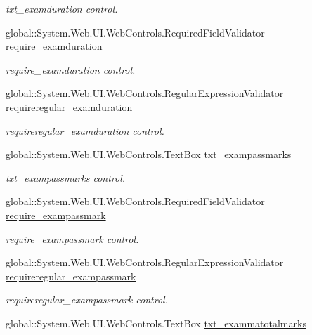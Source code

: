 \begin{DoxyCompactItemize}
\begin{DoxyCompactList}\small\item\em txt\+\_\+examduration control. \end{DoxyCompactList}\item 
global\+::\+System.\+Web.\+U\+I.\+Web\+Controls.\+Required\+Field\+Validator \mbox{\hyperlink{class_admin__exam_ae0f02ff019e950f34484b1da334ed16f}{require\+\_\+examduration}}
\begin{DoxyCompactList}\small\item\em require\+\_\+examduration control. \end{DoxyCompactList}\item 
global\+::\+System.\+Web.\+U\+I.\+Web\+Controls.\+Regular\+Expression\+Validator \mbox{\hyperlink{class_admin__exam_a6f0c2fda924ac5d196aed5c8ca205885}{requireregular\+\_\+examduration}}
\begin{DoxyCompactList}\small\item\em requireregular\+\_\+examduration control. \end{DoxyCompactList}\item 
global\+::\+System.\+Web.\+U\+I.\+Web\+Controls.\+Text\+Box \mbox{\hyperlink{class_admin__exam_aac846d2da109a91c738e315bc4a47ac9}{txt\+\_\+exampassmarks}}
\begin{DoxyCompactList}\small\item\em txt\+\_\+exampassmarks control. \end{DoxyCompactList}\item 
global\+::\+System.\+Web.\+U\+I.\+Web\+Controls.\+Required\+Field\+Validator \mbox{\hyperlink{class_admin__exam_ac1e52aa784d879c0a293f0693011e8be}{require\+\_\+exampassmark}}
\begin{DoxyCompactList}\small\item\em require\+\_\+exampassmark control. \end{DoxyCompactList}\item 
global\+::\+System.\+Web.\+U\+I.\+Web\+Controls.\+Regular\+Expression\+Validator \mbox{\hyperlink{class_admin__exam_a7d0e4ac0336be98c1b2678128b1e2ee2}{requireregular\+\_\+exampassmark}}
\begin{DoxyCompactList}\small\item\em requireregular\+\_\+exampassmark control. \end{DoxyCompactList}\item 
global\+::\+System.\+Web.\+U\+I.\+Web\+Controls.\+Text\+Box \mbox{\hyperlink{class_admin__exam_aad1c3d4c877bf9551b4d5d7f1c085eb4}{txt\+\_\+exammatotalmarks}}

\end{DoxyCompactItemize}
